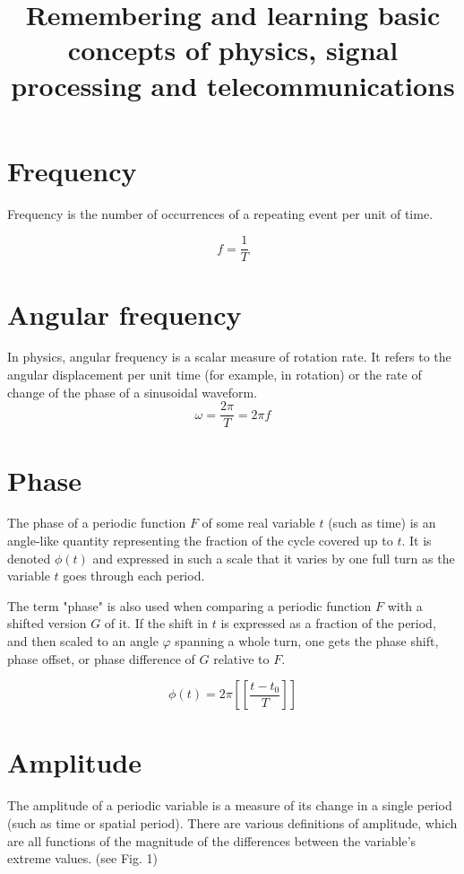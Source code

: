 \documentclass[journal,compsoc]{IEEEtran}
\begin{document}
\title{Remembering and learning basic concepts of physics, signal processing and telecommunications \\
}

\maketitle

\section{Frequency}

Frequency is the number of occurrences of a repeating event per unit of time.

\[ f = \frac{1}{T} \] 

\section{Angular frequency}
In physics, angular frequency is a scalar measure of rotation rate. It refers to the angular displacement per unit time (for example, in rotation) or the rate of change of the phase of a sinusoidal waveform.
\[\omega = \frac{2\pi}{T} = 2\pi f \]

\section{Phase}
The phase of a periodic function \(F\) of some real variable \(t\) (such as time) is an angle-like quantity representing the fraction of the cycle covered up to \(t\). It is denoted \(\phi(t)\) and expressed in such a scale that it varies by one full turn as the variable \(t\) goes through each period.

The term "phase" is also used when comparing a periodic function \(F\) with a shifted version \(G\) of it. If the shift in \(t\) is expressed as a fraction of the period, and then scaled to an angle \(\varphi\) spanning a whole turn, one gets the phase shift, phase offset, or phase difference of \(G\) relative to \(F\).

\[\phi (t)=2\pi \left[\!\!\left[{\frac {t-t_{0}}{T}}\right]\!\!\right]\]

\section{Amplitude}
The amplitude of a periodic variable is a measure of its change in a single period (such as time or spatial period). There are various definitions of amplitude, which are all functions of the magnitude of the differences between the variable's extreme values. (see Fig. 1)
\end{document}
